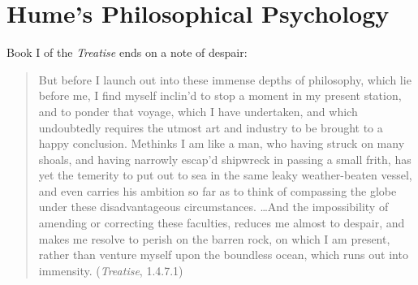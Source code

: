 

\section{Hume's Philosophical Psychology}\label{sec:hume_s_psychology} %

Book I of the \emph{Treatise} ends on a note of despair:

\begin{quote}
    But before I launch out into these immense depths of philosophy, which lie before me, I find myself inclin’d to stop a moment in my present station, and to ponder that voyage, which I have undertaken, and which undoubtedly requires the utmost art and industry to be brought to a happy conclusion. Methinks I am like a man, who having struck on many shoals, and having narrowly escap'd shipwreck in passing a small frith, has yet the temerity to put out to sea in the same leaky weather-beaten vessel, and even carries his ambition so far as to think of compassing the globe under these disadvantageous circumstances. \ldots And the impossibility of amending or correcting these faculties, reduces me almost to despair, and makes me resolve to perish on the barren rock, on which I am present, rather than venture myself upon the boundless ocean, which runs out into immensity. (\emph{Treatise}, 1.4.7.1)
\end{quote}

